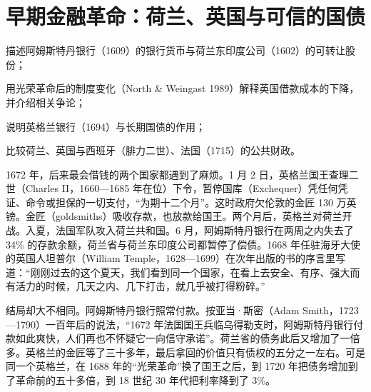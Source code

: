 \chapter{早期金融革命：荷兰、英国与可信的国债}\label{ch:finrevolution}

\begin{chapterguide}
\begin{guidegoals}
\item 描述阿姆斯特丹银行（1609）的银行货币与荷兰东印度公司（1602）的可转让股份；
\item 用光荣革命后的制度变化（North \& Weingast 1989）解释英国借款成本的下降，并介绍相关争论；
\item 说明英格兰银行（1694）与长期国债的作用；
\item 比较荷兰、英国与西班牙（腓力二世）、法国（1715）的公共财政。
\end{guidegoals}
\end{chapterguide}

1672 年，后来最会借钱的两个国家都遇到了麻烦。1 月 2 日，英格兰国王查理二世（Charles II，1660—1685 年在位）下令，暂停国库（Exchequer）凭任何凭证、命令或担保的一切支付，“为期十二个月”。这时政府欠伦敦的金匠 130 万英镑。金匠（goldsmiths）吸收存款，也放款给国王\cite{andreades1909}。两个月后，英格兰对荷兰开战。入夏，法国军队攻入荷兰共和国。6 月，阿姆斯特丹银行在两周之内失去了 34\% 的存款余额，荷兰省与荷兰东印度公司都暂停了偿债\cite{qr2010}。1668 年任驻海牙大使的英国人坦普尔（William Temple，1628—1699）在次年出版的书的序言里写道：“刚刚过去的这个夏天，我们看到同一个国家，在看上去安全、有序、强大而有活力的时候，几天之内、几下打击，就几乎被打得粉碎。”\cite{temple1673}

结局却大不相同。阿姆斯特丹银行照常付款。按亚当·斯密（Adam Smith，1723—1790）一百年后的说法，“1672 年法国国王兵临乌得勒支时，阿姆斯特丹银行付款如此爽快，人们再也不怀疑它一向信守承诺”\cite{smith1776}。荷兰省的债务此后又增加了一倍多。英格兰的金匠等了三十多年，最后拿回的价值只有债权的五分之一左右。可是同一个英格兰，在 1688 年的“光荣革命”换了国王之后，到 1720 年把债务增加到了革命前的五十多倍，到 18 世纪 30 年代把利率降到了 3\%\cite{nw1989}。

